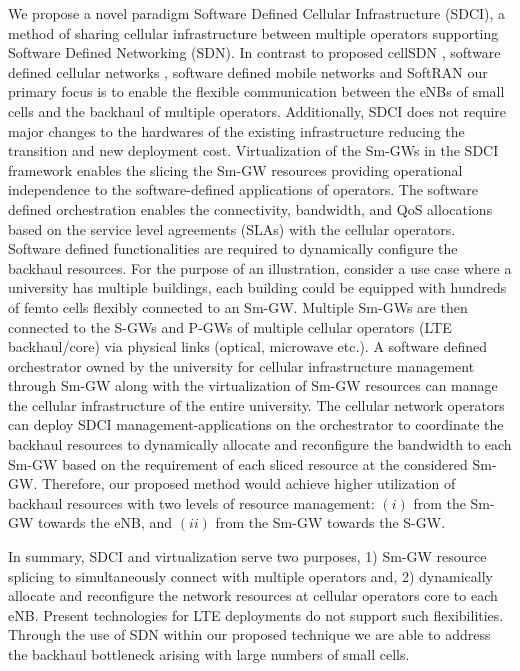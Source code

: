 \documentclass[journal,twoside,comsoc]{IEEEtran}
\begin{document}
We propose a novel paradigm Software Defined Cellular Infrastructure (SDCI), 
a method of sharing cellular infrastructure between multiple operators supporting
Software Defined Networking (SDN). In contrast to proposed cellSDN \cite{li2013cellsdn},
software defined cellular networks \cite{li2012toward}, 
software defined mobile networks \cite{pentikousis2013mobileflow} 
and SoftRAN \cite{gud2013sof} our primary focus is to enable 
the flexible communication between the eNBs of small cells and
the backhaul of multiple operators. Additionally, SDCI does not require major changes
to the hardwares of the existing infrastructure 
reducing the transition and new deployment cost.  
Virtualization of the Sm-GWs in the SDCI framework
enables the slicing the Sm-GW resources providing operational
independence to the software-defined applications of
operators. The software defined orchestration enables the 
connectivity, bandwidth, and QoS allocations based on the
service level agreements (SLAs) with the cellular operators.  
Software defined functionalities are required to dynamically 
configure the backhaul resources. 
For the purpose of an illustration, 
consider a use case where a university has multiple buildings, each
building could be equipped with hundreds of femto cells flexibly
connected to an Sm-GW. Multiple Sm-GWs are then connected to the S-GWs
and P-GWs of multiple cellular operators (LTE backhaul/core) via
physical links (optical, microwave etc.). 
A software defined orchestrator owned by the university 
for cellular infrastructure management through Sm-GW along with the
virtualization of Sm-GW resources can manage the cellular 
infrastructure of the entire university. 
The cellular network operators can
deploy SDCI management-applications on the orchestrator to 
coordinate the backhaul resources to dynamically 
allocate and reconfigure the bandwidth 
to each Sm-GW based on the requirement of each 
sliced resource at the considered Sm-GW.
Therefore, our proposed method would 
achieve higher utilization of backhaul resources
with two levels of resource management:
$(i)$  from the Sm-GW towards the eNB, and
$(ii)$ from the Sm-GW towards the S-GW.

In summary, SDCI and virtualization serve two purposes, 1) Sm-GW
resource splicing to simultaneously connect with multiple operators
and, 2) dynamically allocate and reconfigure the network resources 
at cellular operators core to each eNB.
Present technologies for LTE deployments do not
support such flexibilities. Through the use of SDN within
our proposed technique we are able to
address the backhaul bottleneck arising with large numbers of small cells.
\end{document}
